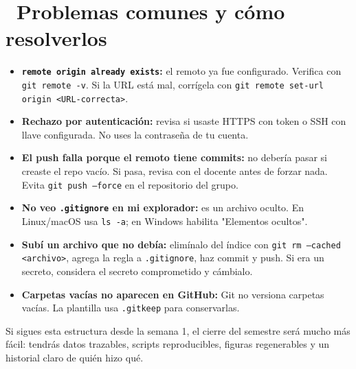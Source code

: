 \documentclass[11pt,a4paper]{article}
\newcommand{\iconotexto}[2]{\textcolor{cyanNeon}{\faIcon{#1}}~#2}
\begin{document}
\section{\iconotexto{life-ring}{Problemas comunes y cómo resolverlos}}

\begin{tcolorbox}[cajaMejora,title={\faIcon{bug}~Errores frecuentes}]
\begin{itemize}[leftmargin=1.4em,itemsep=4pt,topsep=2pt]
  \item \textbf{\texttt{remote origin already exists}:} el remoto ya fue configurado. Verifica con \texttt{git remote -v}. Si la URL está mal, corrígela con \texttt{git remote set-url origin <URL-correcta>}.
  \item \textbf{Rechazo por autenticación:} revisa si usaste HTTPS con token o SSH con llave configurada. No uses la contraseña de tu cuenta.
  \item \textbf{El push falla porque el remoto tiene commits:} no debería pasar si creaste el repo vacío. Si pasa, revisa con el docente antes de forzar nada. Evita \texttt{git push --force} en el repositorio del grupo.
  \item \textbf{No veo \texttt{.gitignore} en mi explorador:} es un archivo oculto. En Linux/macOS usa \texttt{ls -a}; en Windows habilita "Elementos ocultos".
  \item \textbf{Subí un archivo que no debía:} elimínalo del índice con \texttt{git rm --cached <archivo>}, agrega la regla a \texttt{.gitignore}, haz commit y push. Si era un secreto, considera el secreto comprometido y cámbialo.
  \item \textbf{Carpetas vacías no aparecen en GitHub:} Git no versiona carpetas vacías. La plantilla usa \texttt{.gitkeep} para conservarlas.
\end{itemize}
\end{tcolorbox}

\begin{tcolorbox}[cajaFortaleza]
Si sigues esta estructura desde la semana 1, el cierre del semestre será mucho más fácil: tendrás datos trazables, scripts reproducibles, figuras regenerables y un historial claro de quién hizo qué.
\end{tcolorbox}
\end{document}
